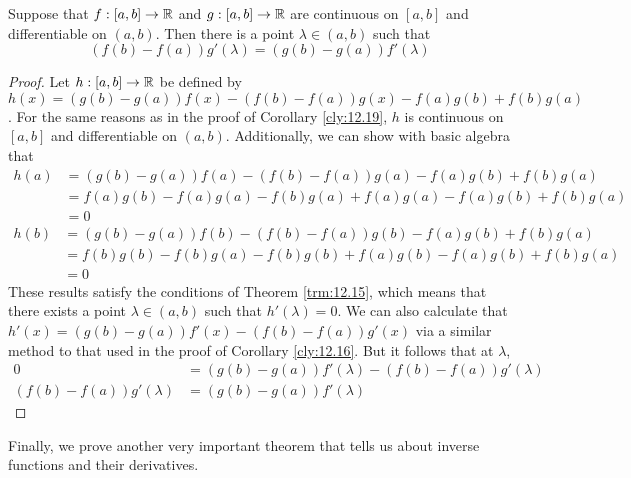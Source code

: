 \documentclass[../main.tex]{subfiles}
\begin{document}
\begin{corollary}\label{cly:12.20}
    Suppose that $f:[a,b]\to\mathbb{R}$ and $g:[a,b]\to\mathbb{R}$ are continuous on $[a,b]$ and differentiable on $(a,b)$. Then there is a point $\lambda\in(a,b)$ such that
    \begin{equation*}
        (f(b)-f(a))g'(\lambda) = (g(b)-g(a))f'(\lambda)
    \end{equation*}
    \begin{proof}
        Let $h:[a,b]\to\mathbb{R}$ be defined by $h(x)=(g(b)-g(a))f(x)-(f(b)-f(a))g(x)-f(a)g(b)+f(b)g(a)$. For the same reasons as in the proof of Corollary \ref{cly:12.19}, $h$ is continuous on $[a,b]$ and differentiable on $(a,b)$. Additionally, we can show with basic algebra that
        \begin{align*}
            h(a) &= (g(b)-g(a))f(a)-(f(b)-f(a))g(a)-f(a)g(b)+f(b)g(a)\\  
            &= f(a)g(b)-f(a)g(a)-f(b)g(a)+f(a)g(a)-f(a)g(b)+f(b)g(a)\\
            &= 0
        \end{align*}
        \begin{align*}
            h(b) &= (g(b)-g(a))f(b)-(f(b)-f(a))g(b)-f(a)g(b)+f(b)g(a)\\
            &= f(b)g(b)-f(b)g(a)-f(b)g(b)+f(a)g(b)-f(a)g(b)+f(b)g(a)\\
            &= 0
        \end{align*}
        These results satisfy the conditions of Theorem \ref{trm:12.15}, which means that there exists a point $\lambda\in(a,b)$ such that $h'(\lambda)=0$. We can also calculate that $h'(x)=(g(b)-g(a))f'(x)-(f(b)-f(a))g'(x)$ via a similar method to that used in the proof of Corollary \ref{cly:12.16}. But it follows that at $\lambda$,
        \begin{align*}
            0 &= (g(b)-g(a))f'(\lambda)-(f(b)-f(a))g'(\lambda)\\
            (f(b)-f(a))g'(\lambda) &= (g(b)-g(a))f'(\lambda)
        \end{align*}
    \end{proof}
\end{corollary}

Finally, we prove another very important theorem that tells us about inverse functions and their derivatives.
\end{document}
